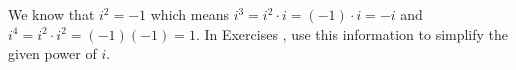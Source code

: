 {\noindent We know that $i^{2} = -1$ which means $i^{3} = i^{2} \cdot i = (-1) \cdot i = -i$ and $i^{4} = i^{2} \cdot i^{2} = (-1)(-1) = 1$. In Exercises}
{, use this information to simplify the given power of $i$.}
